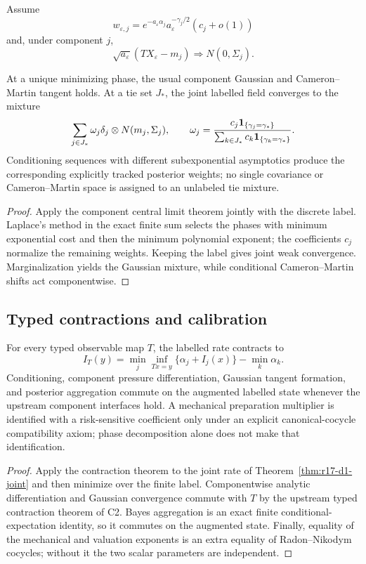 Assume
\[
 w_{\varepsilon,j}
 =e^{-a_\varepsilon\alpha_j}
 a_\varepsilon^{-\gamma_j/2}
 (c_j+o(1))
\]
and, under component $j$,
\[
 \sqrt{a_\varepsilon}
 (T X_\varepsilon-m_j)\Rightarrow N(0,\Sigma_j).
\]

\begin{theorem}
\label{thm:r17-d1-gaussian}
At a unique minimizing phase, the usual component Gaussian and
Cameron--Martin tangent holds.  At a tie set $J_*$, the joint labelled field
converges to the mixture
\[
 \sum_{j\in J_*}\omega_j
 \delta_j\otimes N(m_j,\Sigma_j),
\qquad
 \omega_j={c_j\mathbf 1_{\{\gamma_j=\gamma_*\}}
 \over\sum_{k\in J_*}c_k
 \mathbf 1_{\{\gamma_k=\gamma_*\}}}.
\]
Conditioning sequences with different subexponential asymptotics produce the
corresponding explicitly tracked posterior weights; no single covariance or
Cameron--Martin space is assigned to an unlabeled tie mixture.
\end{theorem}

\begin{proof}
Apply the component central limit theorem jointly with the discrete label.
Laplace's method in the exact finite sum selects the phases with minimum
exponential cost and then the minimum polynomial exponent; the coefficients
$c_j$ normalize the remaining weights.  Keeping the label gives joint weak
convergence.  Marginalization yields the Gaussian mixture, while conditional
Cameron--Martin shifts act componentwise.
\end{proof}

\subsection{Typed contractions and calibration}

\begin{theorem}
\label{thm:r17-d1-contraction}
For every typed observable map $T$, the labelled rate contracts to
\[
 I_T(y)=\min_j\inf_{Tx=y}
 \{\alpha_j+I_j(x)\}-\min_k\alpha_k.
\]
Conditioning, component pressure differentiation, Gaussian tangent formation,
and posterior aggregation commute on the augmented labelled state whenever
the upstream component interfaces hold.  A mechanical preparation multiplier
is identified with a risk-sensitive coefficient only under an explicit
canonical-cocycle compatibility axiom; phase decomposition alone does not
make that identification.
\end{theorem}

\begin{proof}
Apply the contraction theorem to the joint rate of
Theorem~\ref{thm:r17-d1-joint} and then minimize over the finite label.
Componentwise analytic differentiation and Gaussian convergence commute with
$T$ by the upstream typed contraction theorem of C2.  Bayes aggregation is an
exact finite conditional-expectation identity, so it commutes on the
augmented state.  Finally, equality of the mechanical and valuation exponents
is an extra equality of Radon--Nikodym cocycles; without it the two scalar
parameters are independent.
\end{proof}

